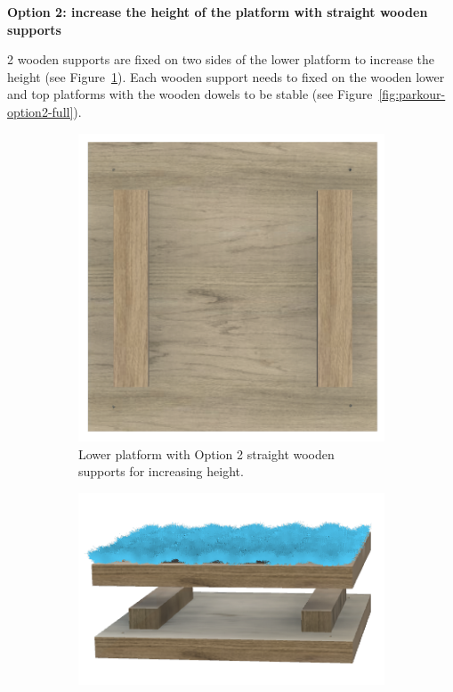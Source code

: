 {\bigskip

{\bfseries Option 2: increase the height of the platform with straight wooden
           supports}

\headlinebox

2 wooden supports are fixed on two sides of the lower platform to increase the
height (see Figure~\ref{fig:parkour-option2-lower}).
Each wooden support needs to fixed on the wooden lower and top platforms with
the wooden dowels to be stable (see Figure~\ref {fig:parkour-option2-full}).

\begin{figure}[htb]
  \begin{subfigure}{.45\textwidth}
    \centering
    \includegraphics[width=\textwidth]{img/parkour/option2_lower}
    \caption{Lower platform with Option 2 straight wooden supports for increasing
             height.}
    \label{fig:parkour-option2-lower}
  \end{subfigure}
  \hfill
  \begin{subfigure}{.45\textwidth}
    \centering
    \includegraphics[width=\textwidth]{img/parkour/option2_full}

\end{subfigure}
\end{figure}}
